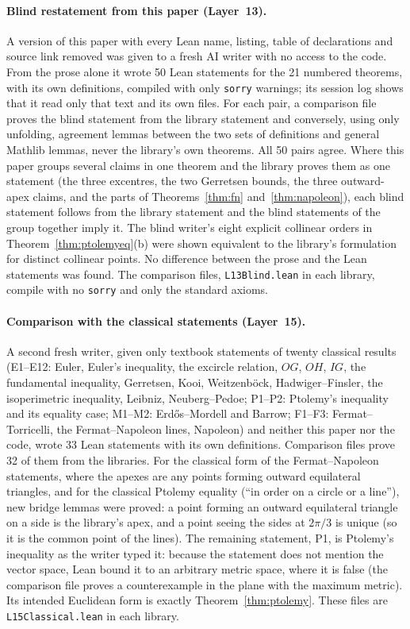 \documentclass[11pt]{article}
\theoremstyle{definition}
\theoremstyle{remark}
\newcommand{\lean}[1]{\texttt{#1}}
\begin{document}
\paragraph{Blind restatement from this paper (Layer~13).} A version of this paper with every Lean
name, listing, table of declarations and source link removed was given to a fresh AI writer with no
access to the code. From the prose alone it wrote 50 Lean statements for the 21 numbered theorems,
with its own definitions, compiled with only \lean{sorry} warnings; its session log shows that it
read only that text and its own files. For each pair, a comparison file proves the blind statement
from the library statement and conversely, using only unfolding, agreement lemmas between the two
sets of definitions and general Mathlib lemmas, never the library's own theorems. All 50 pairs agree.
Where this paper groups several claims in one theorem and the library proves them as one statement
(the three excentres, the two Gerretsen bounds, the three outward-apex claims, and the parts of
Theorems~\ref{thm:fn} and~\ref{thm:napoleon}), each blind statement follows from the library
statement and the blind statements of the group together imply it. The blind writer's eight
explicit collinear orders in Theorem~\ref{thm:ptolemyeq}(b) were shown equivalent to the library's
formulation for distinct collinear points. No difference between the prose and the Lean statements
was found. The comparison files, \lean{L13Blind.lean} in each library, compile with no \lean{sorry}
and only the standard axioms.

\paragraph{Comparison with the classical statements (Layer~15).} A second fresh writer, given only
textbook statements of twenty classical results (E1--E12: Euler, Euler's inequality, the excircle
relation, $OG$, $OH$, $IG$, the fundamental inequality, Gerretsen, Kooi, Weitzenb\"ock,
Hadwiger--Finsler, the isoperimetric inequality, Leibniz, Neuberg--Pedoe; P1--P2: Ptolemy's
inequality and its equality case; M1--M2: Erdős--Mordell and Barrow; F1--F3: Fermat--Torricelli,
the Fermat--Napoleon lines, Napoleon) and neither this paper nor the code, wrote 33 Lean statements
with its own definitions. Comparison files prove 32 of them from the libraries. For the classical
form of the Fermat--Napoleon statements, where the apexes are any points forming outward equilateral
triangles, and for the classical Ptolemy equality (``in order on a circle or a line''), new bridge
lemmas were proved: a point forming an outward equilateral triangle on a side is the library's apex,
and a point seeing the sides at $2\pi/3$ is unique (so it is the common point of the lines). The
remaining statement, P1, is Ptolemy's inequality as the writer typed it: because the statement does
not mention the vector space, Lean bound it to an arbitrary metric space, where it is false (the
comparison file proves a counterexample in the plane with the maximum metric). Its intended
Euclidean form is exactly Theorem~\ref{thm:ptolemy}. These files are \lean{L15Classical.lean} in each
library.
\end{document}
